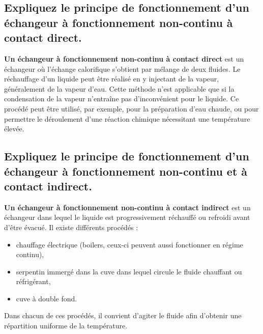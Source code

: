 \subsection{Expliquez le principe de fonctionnement d'un échangeur à fonctionnement non-continu à contact direct.}
\textbf{Un échangeur à fonctionnement non-continu à contact direct} est un échangeur où l'échange calorifique s'obtient par mélange de deux fluides. Le réchauffage d'un liquide peut être réalisé en y injectant de la vapeur, généralement de la vapeur d'eau. Cette méthode n'est applicable que si la condensation de la vapeur n'entraîne pas d'inconvénient pour le liquide. Ce procédé peut être utilisé, par exemple, pour la préparation d'eau chaude, ou pour permettre le déroulement d'une réaction chimique nécessitant une température élevée.

\subsection{Expliquez le principe de fonctionnement d'un échangeur à fonctionnement non-continu et à contact indirect.}
\textbf{Un échangeur à fonctionnement non-continu à contact indirect} est un échangeur dans lequel le liquide est progressivement réchauffé ou refroidi avant d'être évacué. Il existe différents procédés :
\begin{itemize}
\item chauffage électrique (boilers, ceux-ci peuvent aussi fonctionner en régime continu),
\item serpentin immergé dans la cuve dans lequel circule le fluide chauffant ou réfrigérant,
\item cuve à double fond.
\end{itemize}
Dans chacun de ces procédés, il convient d'agiter le fluide afin d'obtenir une répartition uniforme de la température.
